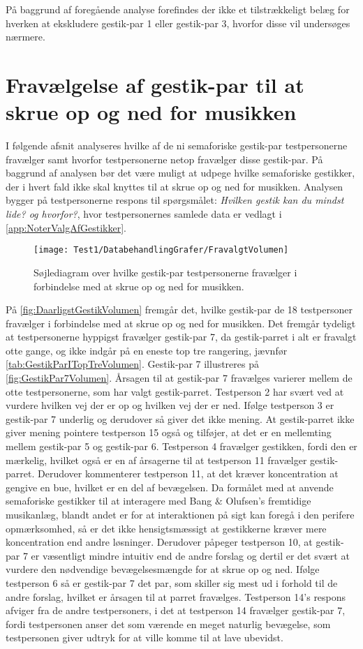 På baggrund af foregående analyse forefindes der ikke et tilstrækkeligt belæg for hverken at ekskludere gestik-par 1 eller gestik-par 3, hvorfor disse vil undersøges nærmere. 
%
\section{Fravælgelse af gestik-par til at skrue op og ned for musikken}
\label{app:TestresultaterVolumenDaarlig}
%
I følgende afsnit analyseres hvilke af de ni semaforiske gestik-par testpersonerne fravælger samt hvorfor testpersonerne netop fravælger disse gestik-par. På baggrund af analysen bør det være muligt at udpege hvilke semaforiske gestikker, der i hvert fald ikke skal knyttes til at skrue op og ned for musikken. Analysen bygger på testpersonerne respons til spørgsmålet: \textit{Hvilken gestik kan du mindst lide? og hvorfor?}, hvor testpersonernes samlede data er vedlagt i \autoref{app:NoterValgAfGestikker}.
%
\begin{figure}[H]
	\centering
	\texttt{[image: Test1/DatabehandlingGrafer/FravalgtVolumen]}
	\caption{Søjlediagram over hvilke gestik-par testpersonerne fravælger i forbindelse med at skrue op og ned for musikken.}
	\label{fig:DaarligstGestikVolumen}
\end{figure}
\noindent
%
På \autoref{fig:DaarligstGestikVolumen} fremgår det, hvilke gestik-par de 18 testpersoner fravælger i forbindelse med at skrue op og ned for musikken. Det fremgår tydeligt at testpersonerne hyppigst fravælger gestik-par 7, da gestik-parret i alt er fravalgt otte gange, og ikke indgår på en eneste top tre rangering, jævnfør \autoref{tab:GestikParITopTreVolumen}. Gestik-par 7 illustreres på \autoref{fig:GestikPar7Volumen}. Årsagen til at gestik-par 7 fravælges varierer mellem de otte testpersonerne, som har valgt gestik-parret. Testperson 2 har svært ved at vurdere hvilken vej der er op og hvilken vej der er ned. Ifølge testperson 3 er gestik-par 7 underlig og derudover så giver det ikke mening. At gestik-parret ikke giver mening pointere testperson 15 også og tilføjer, at det er en mellemting mellem gestik-par 5 og gestik-par 6. Testperson 4 fravælger gestikken, fordi den er mærkelig, hvilket også er en af årsagerne til at testperson 11 fravælger gestik-parret. Derudover kommenterer testperson 11, at det kræver koncentration at gengive en bue, hvilket er en del af bevægelsen. Da formålet med at anvende semaforiske gestikker til at interagere med Bang $\&$ Olufsen's fremtidige musikanlæg, blandt andet er for at interaktionen på sigt kan foregå i den perifere opmærksomhed, så er det ikke hensigtsmæssigt at gestikkerne kræver mere koncentration end andre løsninger. Derudover påpeger testperson 10, at gestik-par 7 er væsentligt mindre intuitiv end de andre forslag og dertil er det svært at vurdere den nødvendige bevægelsesmængde for at skrue op og ned. Ifølge testperson 6 så er gestik-par 7 det par, som skiller sig mest ud i forhold til de andre forslag, hvilket er årsagen til at parret fravælges. Testperson 14's respons afviger fra de andre testpersoners, i det at testperson 14 fravælger gestik-par 7, fordi testpersonen anser det som værende en meget naturlig bevægelse, som testpersonen giver udtryk for at ville komme til at lave ubevidst.
